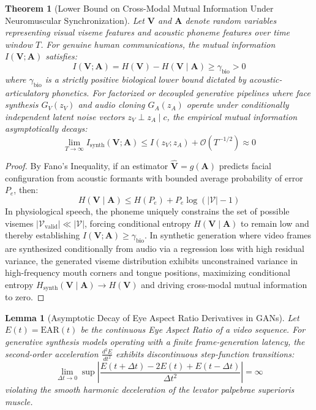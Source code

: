 \documentclass[journal]{IEEEtran}
\newtheorem{theorem}{Theorem}
\newtheorem{lemma}{Lemma}
\begin{document}
\begin{theorem}[Lower Bound on Cross-Modal Mutual Information Under Neuromuscular Synchronization]
Let $\mathbf{V}$ and $\mathbf{A}$ denote random variables representing visual viseme features and acoustic phoneme features over time window $T$. For genuine human communications, the mutual information $I(\mathbf{V}; \mathbf{A})$ satisfies:
\begin{equation}
I(\mathbf{V}; \mathbf{A}) = H(\mathbf{V}) - H(\mathbf{V} \mid \mathbf{A}) \ge \gamma_{\text{bio}} > 0
\end{equation}
where $\gamma_{\text{bio}}$ is a strictly positive biological lower bound dictated by acoustic-articulatory phonetics. For factorized or decoupled generative pipelines where face synthesis $G_V(z_V)$ and audio cloning $G_A(z_A)$ operate under conditionally independent latent noise vectors $z_V \perp z_A \mid c$, the empirical mutual information asymptotically decays:
\begin{equation}
\lim_{T \to \infty} I_{\text{synth}}(\mathbf{V}; \mathbf{A}) \le I(z_V; z_A) + \mathcal{O}(T^{-1/2}) \approx 0
\end{equation}
\end{theorem}

\begin{proof}
By Fano's Inequality, if an estimator $\hat{\mathbf{V}} = g(\mathbf{A})$ predicts facial configuration from acoustic formants with bounded average probability of error $P_e$, then:
\begin{equation}
H(\mathbf{V} \mid \mathbf{A}) \le H(P_e) + P_e \log(|\mathcal{V}| - 1)
\end{equation}
In physiological speech, the phoneme uniquely constrains the set of possible visemes $|\mathcal{V}_{\text{valid}}| \ll |\mathcal{V}|$, forcing conditional entropy $H(\mathbf{V} \mid \mathbf{A})$ to remain low and thereby establishing $I(\mathbf{V}; \mathbf{A}) \ge \gamma_{\text{bio}}$. In synthetic generation where video frames are synthesized conditionally from audio via a regression loss with high residual variance, the generated viseme distribution exhibits unconstrained variance in high-frequency mouth corners and tongue positions, maximizing conditional entropy $H_{\text{synth}}(\mathbf{V} \mid \mathbf{A}) \to H(\mathbf{V})$ and driving cross-modal mutual information to zero.
\end{proof}

\begin{lemma}[Asymptotic Decay of Eye Aspect Ratio Derivatives in GANs]
Let $E(t) = \text{EAR}(t)$ be the continuous Eye Aspect Ratio of a video sequence. For generative synthesis models operating with a finite frame-generation latency, the second-order acceleration $\frac{d^2 E}{dt^2}$ exhibits discontinuous step-function transitions:
\begin{equation}
\lim_{\Delta t \to 0} \sup \left| \frac{E(t + \Delta t) - 2E(t) + E(t - \Delta t)}{\Delta t^2} \right| = \infty
\end{equation}
violating the smooth harmonic deceleration of the levator palpebrae superioris muscle.
\end{lemma}
\end{document}
